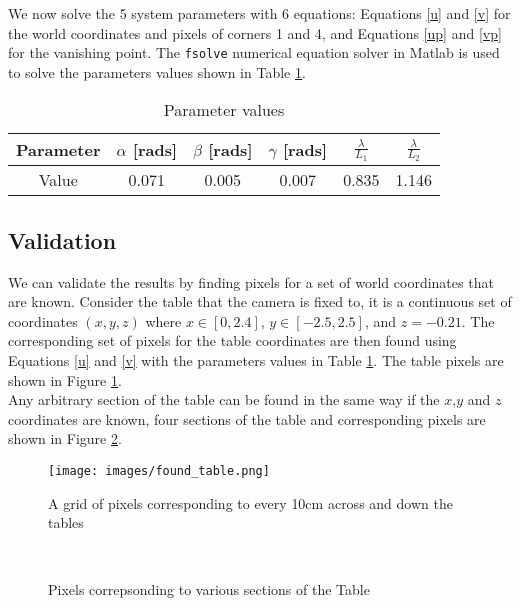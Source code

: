 \documentclass[12pt]{article}
\begin{document}
We now solve the 5 system parameters with 6 equations: Equations \ref{u} and \ref{v} for the world coordinates and pixels of corners 1 and 4, and Equations \ref{up} and \ref{vp} for the vanishing point. The \texttt{fsolve} numerical equation solver in Matlab is used to solve the parameters values shown in Table \ref{table:results}.


\begin{table}[!htb]
\centering
\begin{tabular}{|c|c|c|c|c|c|}
\hline
Parameter & $\alpha$ [rads] & $\beta$ [rads] & $\gamma$ [rads] & $\frac{\lambda}{L_1}$ & $\frac{\lambda}{L_2}$\\
\hline
Value & 0.071 & 0.005 & 0.007 & 0.835 & 1.146 \\
\hline
\end{tabular}
\caption{Parameter values}
\label{table:results}
\end{table}


\subsection{Validation}
We can validate the results by finding pixels for a set of world coordinates that are known. Consider the table that the camera is fixed to, it is a continuous set of coordinates $(x,y,z)$ where $x \in \left[0,2.4\right]$,  $y \in \left[-2.5,2.5\right]$, and $z=-0.21$.  The corresponding set of pixels for the table coordinates are then found using Equations \ref{u} and \ref{v} with the parameters values in Table \ref{table:results}. The table pixels are shown in Figure \ref{fig:result}. \\

Any arbitrary section of the table can be found in the same way if the $x$,$y$ and $z$ coordinates are known, four sections of the table and corresponding pixels are shown in Figure \ref{fig:multi_table}.


\begin{figure}[h]
\centering
\texttt{[image: images/found\_table.png]}
\caption{A grid of pixels corresponding to every 10cm across and down the tables}\label{fig:result}
\end{figure}

\begin{figure}[h]
    \centering
    \qquad
	\\
    \qquad
    \caption{Pixels correpsonding to various sections of the Table}%
    \label{fig:multi_table}%
\end{figure}
\end{document}
